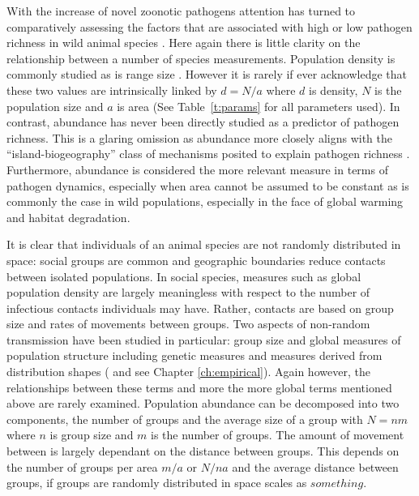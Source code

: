 With the increase of novel zoonotic pathogens \cite{jones2008global} attention has turned to comparatively assessing the factors that are associated with high or low pathogen richness in wild animal species \cite{poulin2000diversity}.
Here again there is little clarity on the relationship between a number of species measurements.
Population density is commonly studied \cite{morand1998density, kamiya2014determines, lindenfors2007parasite, nunn2003comparative, arneberg2002host} as is range size \cite{lindenfors2007parasite, nunn2003comparative, turmelle2009correlates, huang2015parasite, kamiya2014determines}.
However it is rarely if ever acknowledge that these two values are intrinsically linked by $d = N/a$ where $d$ is density, $N$ is the population size and $a$ is area (See Table~\ref{t:params} for all parameters used).
In contrast, abundance has never been directly studied as a predictor of pathogen richness.
This is a glaring omission as abundance more closely aligns with the ``island-biogeography'' class of mechanisms posited to explain pathogen richness \cite{}.
Furthermore, abundance is considered the more relevant measure in terms of pathogen dynamics, especially when area cannot be assumed to be constant \cite{begon2002clarification} as is commonly the case in wild populations, especially in the face of global warming and habitat degradation.

It is clear that individuals of an animal species are not randomly distributed in space: social groups are common \cite{kerth2008causes} and geographic boundaries reduce contacts between isolated populations.
In social species, measures such as global population density are largely meaningless with respect to the number of infectious contacts individuals may have.
Rather, contacts are based on group size and rates of movements between groups.
Two aspects of non-random transmission have been studied in particular: group size \cite{vitone2004body, gay2014parasite, ezenwa2006host, rifkin2012animals, nunn2003comparative} and global measures of population structure including genetic measures and measures derived from distribution shapes (\textcite{gay2014parasite, maganga2014bat, turmelle2009correlates} and see Chapter \ref{ch:empirical}).
Again however, the relationships between these terms and more the more global terms mentioned above are rarely examined.
Population abundance can be decomposed into two components, the number of groups and the average size of a group with $N = nm$ where $n$ is group size and $m$ is the number of groups.
The amount of movement between is largely dependant on the distance between groups.
This depends on the number of groups per area $m/a$ or $N/na$ and the average distance between groups, if groups are randomly distributed in space scales as $something$.

